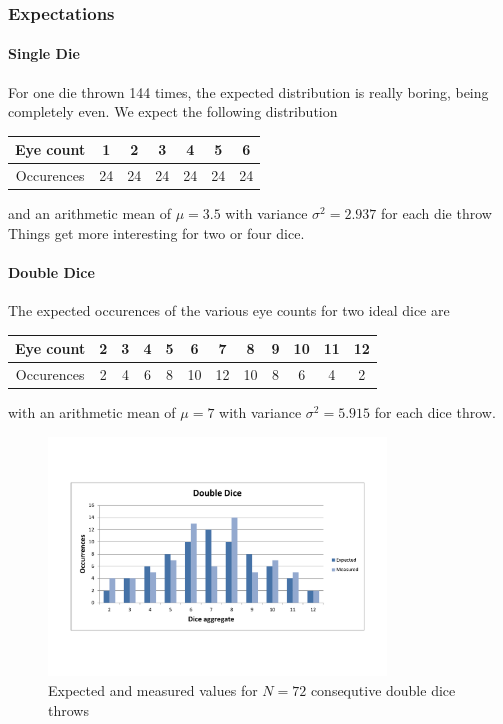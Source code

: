 \documentclass{scrreprt}
\begin{document}
\subsubsection{Expectations}

\paragraph{Single Die}
For one die thrown 144 times, the expected distribution is really boring, being completely even. We expect the following distribution

\begin{center}
    \begin{tabular}{|c|cccccc|}
    \hline
    Eye count & 1 & 2 & 3 & 4 & 5 & 6\\
    \hline
    Occurences & 24 & 24 & 24 & 24 & 24 & 24\\
    \hline
    \end{tabular}
\end{center}
and an arithmetic mean of $\mu = 3.5$ with variance $\sigma^2 = 2.937$ for each die throw\\

Things get more interesting for two or four dice.

\paragraph{Double Dice}
The expected occurences of the various eye counts for two ideal dice are
\begin{center}
    \begin{tabular}{|c|ccccccccccc|}
    \hline
    Eye count & 2 & 3 & 4 & 5 & 6 & 7 & 8 & 9 & 10 & 11 & 12\\
    \hline
    Occurences & 2 & 4 & 6 & 8 & 10 & 12 & 10 & 8 & 6 & 4 & 2\\
    \hline
    \end{tabular}
\end{center}

with an arithmetic mean of $\mu = 7$ with variance $\sigma^2 = 5.915$ for each dice throw.

\begin{figure}[H]
    \center   
        \includegraphics[width=0.8\textwidth]{img/double_dice_combo.pdf}
        \caption{Expected and measured values for $N=72$ consequtive double dice throws}
\end{figure}
\end{document}
